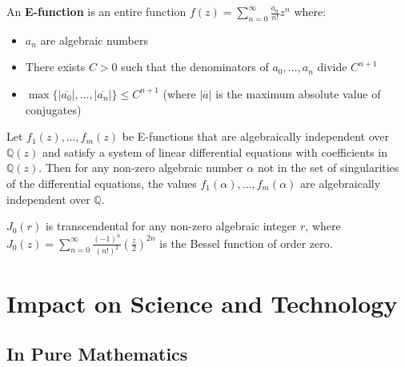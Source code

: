 \begin{definition}[E-Function]
An \textbf{E-function} is an entire function $f(z) = \sum_{n=0}^\infty \frac{a_n}{n!}z^n$ where:
\begin{itemize}
    \item $a_n$ are algebraic numbers
    \item There exists $C > 0$ such that the denominators of $a_0,\dots,a_n$ divide $C^{n+1}$
    \item $\max\{|\overline{a_0}|,\dots,|\overline{a_n}|\} \leq C^{n+1}$ (where $|\overline{a}|$ is the maximum absolute value of conjugates)
\end{itemize}
\end{definition}

\begin{theorem}
Let $f_1(z),\dots,f_m(z)$ be E-functions that are algebraically independent over $\mathbb{Q}(z)$ and satisfy a system of linear differential equations with coefficients in $\mathbb{Q}(z)$. Then for any non-zero algebraic number $\alpha$ not in the set of singularities of the differential equations, the values $f_1(\alpha),\dots,f_m(\alpha)$ are algebraically independent over $\mathbb{Q}$.
\end{theorem}

\begin{corollary}
$J_0(r)$ is transcendental for any non-zero algebraic integer $r$, where $J_0(z) = \sum_{n=0}^\infty \frac{(-1)^n}{(n!)^2} \left(\frac{z}{2}\right)^{2n}$ is the Bessel function of order zero.
\end{corollary}

\section{Impact on Science and Technology}

\subsection{In Pure Mathematics}

